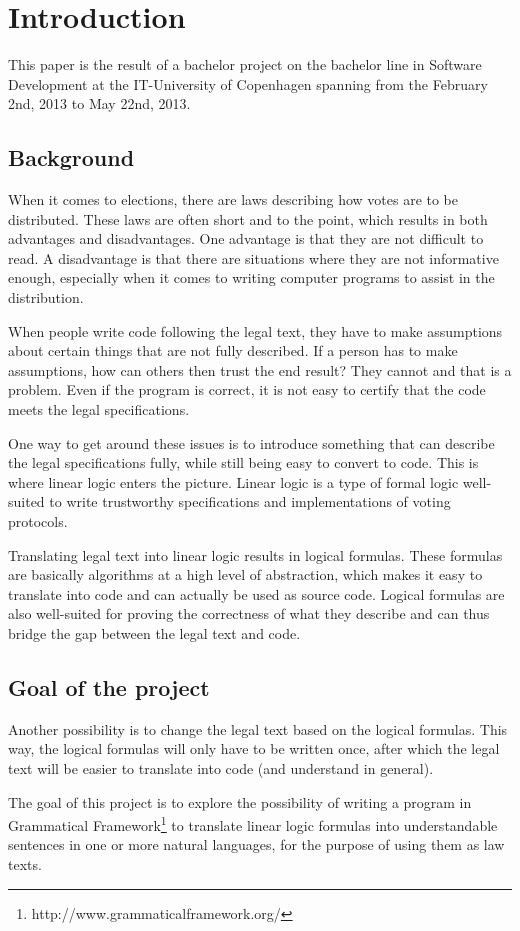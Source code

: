 \chapter{Introduction}
\label{01}

This paper is the result of a bachelor project on the bachelor line in Software Development at the IT-University of Copenhagen spanning from the February 2nd, 2013 to May 22nd, 2013.

\section{Background}
\label{01_01}

When it comes to elections, there are laws describing how votes are to be distributed. These laws are often short and to the point, which results in both advantages and disadvantages. One advantage is that they are not difficult to read. A disadvantage is that there are situations where they are not informative enough, especially when it comes to writing computer programs to assist in the distribution.

When people write code following the legal text, they have to make assumptions about certain things that are not fully described. If a person has to make assumptions, how can others then trust the end result? They cannot and that is a problem. Even if the program is correct, it is not easy to certify that the code meets the legal specifications.

One way to get around these issues is to introduce something that can describe the legal specifications fully, while still being easy to convert to code. This is where linear logic enters the picture. Linear logic is a type of formal logic well-suited to write trustworthy specifications and implementations of voting protocols. 

Translating legal text into linear logic results in logical formulas. These formulas are basically algorithms at a high level of abstraction, which makes it easy to translate into code and can actually be used as source code. Logical formulas are also well-suited for proving the correctness of what they describe and can thus bridge the gap between the legal text and code. 

\section{Goal of the project}
\label{01_02}

Another possibility is to change the legal text based on the logical formulas. This way, the logical formulas will only have to be written once, after which the legal text will be easier to translate into code (and understand in general).

The goal of this project is to explore the possibility of writing a program in Grammatical Framework\footnote{http://www.grammaticalframework.org/} to translate linear logic formulas into understandable sentences in one or more natural languages, for the purpose of using them as law texts.